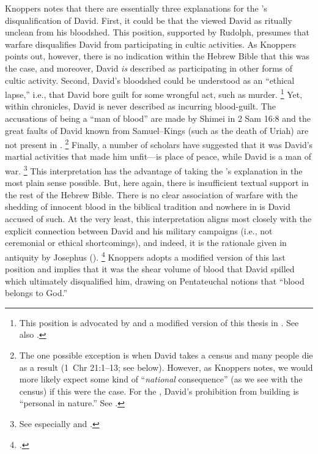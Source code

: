 Knoppers notes that there are essentially three explanations for the \chronicler's disqualification of David. First, it could be that the \chronicler viewed David as ritually unclean from his bloodshed. This position, supported by Rudolph, presumes that warfare disqualifies David from participating in cultic activities.%
    \autocite[151]{rudolph1955}
As Knoppers points out, however, there is no indication within the Hebrew Bible that this was the case, and moreover, David \emph{is} described as participating in other forms of cultic activity.\autocite[772]{knoppers2007} Second, David's bloodshed could be understood as an ``ethical lapse,'' i.e., that David bore guilt for some wrongful act, such as murder.%
    \footnote{This position is advocated by \cite[53]{dirksen_jsot1996} and a modified version of this thesis in \cite{kelly_jsot1998}. See also \cite{braun_jbl1976}.}
Yet, within chronicles, David is never described as incurring blood-guilt. The accusations of being a ``man of blood'' are made by Shimei in 2 Sam 16:8 and the great faults of David known from Samuel--Kings (such as the death of Uriah) are not present in \chronicles.%
    \footnote{The one possible exception is when David takes a census and many people die as a result (1~Chr 21:1--13; see below). However, as Knoppers notes, we would more likely expect some kind of ``\emph{national} consequence'' (as we see with the census) if this were the case. For the \chronicler, David's prohibition from building \thetemple is ``personal in nature.'' See \cite[772--773]{knoppers2007}.}
Finally, a number of scholars have suggested that it was David's martial activities that made him unfit---\thetemple is place of peace, while David is a man of war.%
    \footnote{See especially \cite[396--397]{japhet1993} and \cite{mckenzie_graham-etal1999}.}
This interpretation has the advantage of taking the \chronicler's explanation in the most plain sense possible. But, here again, there is insufficient textual support in the rest of the Hebrew Bible. There is no clear association of warfare with the shedding of innocent blood in the biblical tradition and nowhere in \chronicles is David accused of such. At the very least, this interpretation aligns most closely with the explicit connection between David and his military campaigns (i.e., not ceremonial or ethical shortcomings), and indeed, it is the rationale given in antiquity by Josephus ().%
    \footnote{\Cite[773]{knoppers2007}.}
Knoppers adopts a modified version of this last position and implies that it was the shear volume of blood that David spilled which ultimately disqualified him, drawing on Pentateuchal notions that ``blood belongs to God.''\autocite[774]{knoppers2007}

